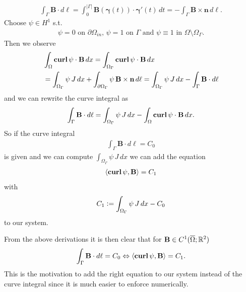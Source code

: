 \documentclass[../master_thesis.tex]{subfiles}
\begin{document}
\begin{align*}
    \int_\Gamma \mathbf{B}\cdot d\ell= \int_0^{|\Gamma|} \mathbf{B}(\bm{\gamma}(t)) \cdot \bm{\gamma}'(t) \, dt 
    = -\int_\Gamma  \mathbf{B}\times \mathbf{n} \,d\ell.
\end{align*}
Choose $\psi \in H^1$ s.t. 
\begin{align}
    \text{$\psi = 0$ on $\partial \Omega_{in}$, $\psi = 1$ on 
    $\Gamma$ and $\psi \equiv 1$ in $\Omega \setminus \Omega_\Gamma$}.\label{eq:conditions_psi}
\end{align}
Then we observe 
\begin{align*}
    &\int_\Omega \veccurl \psi \cdot \mathbf{B} \, dx = 
    \int_{\Omega_\Gamma} \veccurl \psi \cdot \mathbf{B} \, dx 
    \\ &= \int_{\Omega_\Gamma} \psi \, J \, dx + \int_{\partial\Omega_\Gamma} \psi\,\mathbf{B} \times \mathbf{n}\, d\ell
    = \int_{\Omega_\Gamma} \psi \, J \, dx - \int_\Gamma \mathbf{B}\cdot d\ell
\end{align*}
and we can rewrite the curve integral as 
\begin{align}
    \int_\Gamma \mathbf{B} \cdot d\ell = \int_{\Omega_\Gamma} \psi \, J \, dx - 
        \int_\Omega \veccurl \psi \cdot \mathbf{B} \, dx. \label{eq:rewrite_curve_integral_differentiable}
\end{align}
So if the curve integral 
\begin{align*}
    \int_\Gamma \mathbf{B} \cdot d\ell = C_0
\end{align*}
is given and we can compute $\int_{\Omega_\Gamma} \psi \, J \, dx$
we can add the equation
\begin{align}
    \langle \veccurl \psi, \mathbf{B} \rangle = C_1 \label{eq:variational_curve_integral}
\end{align}
with 
\begin{align*}
    C_1 \vcentcolon= \int_{\Omega_\Gamma} \psi \, J \, dx - C_0
\end{align*}
to our system.

From the above derivations it is then clear that for $\mathbf{B} \in C^1(\overline{\Omega};\real^2)$
\begin{align*}
    \int_\Gamma \mathbf{B} \cdot d\ell = C_0 
    \Leftrightarrow \langle \veccurl \psi, \mathbf{B} \rangle = C_1.
\end{align*}
This is the motivation to add the right equation to our system instead
of the curve integral since it is much easier 
to enforce numerically.
\end{document}
